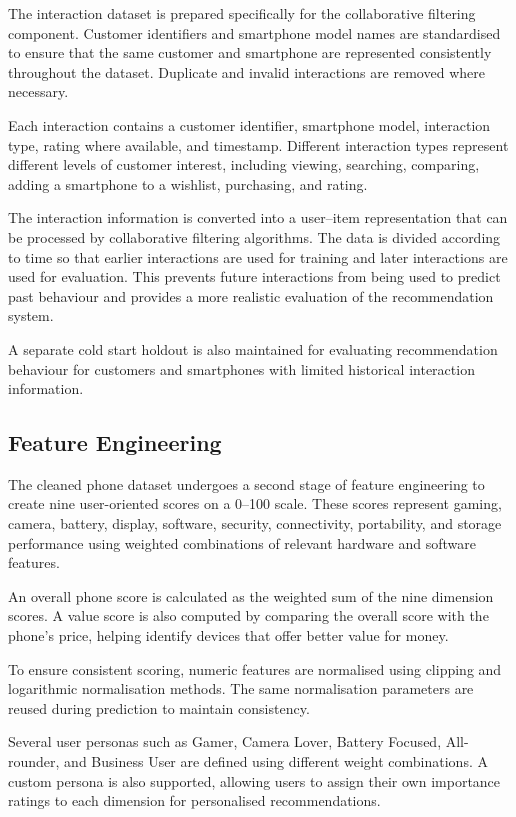 \documentclass[12pt]{report}
\numberwithin{figure}{chapter}
\numberwithin{table}{chapter}
\numberwithin{equation}{chapter}
\begin{document}
The interaction dataset is prepared specifically for the collaborative filtering component. Customer identifiers and smartphone model names are standardised to ensure that the same customer and smartphone are represented consistently throughout the dataset. Duplicate and invalid interactions are removed where necessary.

Each interaction contains a customer identifier, smartphone model, interaction type, rating where available, and timestamp. Different interaction types represent different levels of customer interest, including viewing, searching, comparing, adding a smartphone to a wishlist, purchasing, and rating.

The interaction information is converted into a user--item representation that can be processed by collaborative filtering algorithms. The data is divided according to time so that earlier interactions are used for training and later interactions are used for evaluation. This prevents future interactions from being used to predict past behaviour and provides a more realistic evaluation of the recommendation system.

A separate cold start holdout is also maintained for evaluating recommendation behaviour for customers and smartphones with limited historical interaction information.


\subsection{Feature Engineering}

The cleaned phone dataset undergoes a second stage of feature engineering to create nine user-oriented scores on a 0--100 scale. These scores represent gaming, camera, battery, display, software, security, connectivity, portability, and storage performance using weighted combinations of relevant hardware and software features.

An overall phone score is calculated as the weighted sum of the nine dimension scores. A value score is also computed by comparing the overall score with the phone's price, helping identify devices that offer better value for money.

To ensure consistent scoring, numeric features are normalised using clipping and logarithmic normalisation methods. The same normalisation parameters are reused during prediction to maintain consistency.

Several user personas such as Gamer, Camera Lover, Battery Focused, All-rounder, and Business User are defined using different weight combinations. A custom persona is also supported, allowing users to assign their own importance ratings to each dimension for personalised recommendations.
\end{document}
